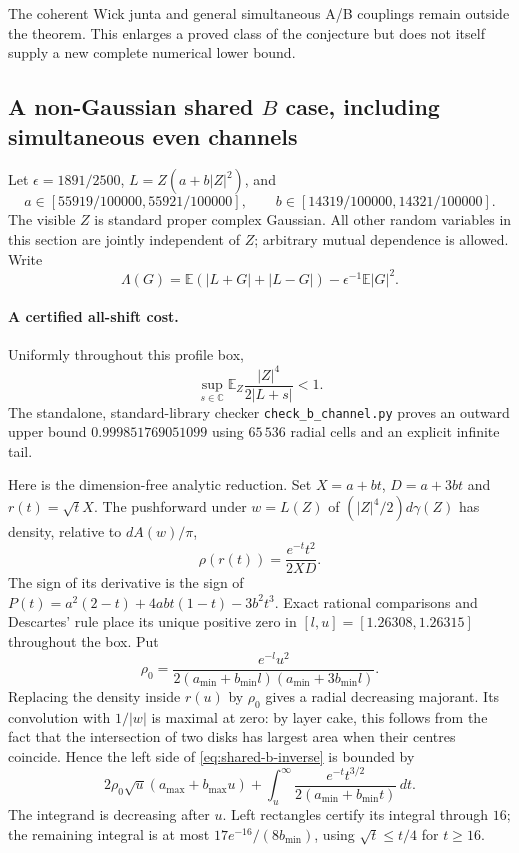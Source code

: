The coherent Wick junta and general simultaneous A/B couplings remain
outside the theorem. This enlarges a proved class of the conjecture but
does not itself supply a new complete numerical lower bound.

\subsection{A non-Gaussian shared $B$ case, including simultaneous even channels}
\label{sec:shared-b-symmetry}
Let $\epsilon=1891/2500$, $L=Z(a+b|Z|^2)$, and
\[
 a\in[55919/100000,55921/100000],\qquad
 b\in[14319/100000,14321/100000].
\]
The visible $Z$ is standard proper complex Gaussian. All other random
variables in this section are jointly independent of $Z$; arbitrary
mutual dependence is allowed. Write
\[
 \Lambda(G)=\mathbb E(|L+G|+|L-G|)-\epsilon^{-1}\mathbb E|G|^2.
\]

\paragraph{A certified all-shift cost.}
Uniformly throughout this profile box,
\begin{equation}\label{eq:shared-b-inverse}
 \sup_{s\in\mathbb C}\mathbb E_Z\frac{|Z|^4}{2|L+s|}<1.
\end{equation}
The standalone, standard-library checker \texttt{check\_b\_channel.py}
proves an outward upper bound $0.999851769051099$ using $65\,536$ radial
cells and an explicit infinite tail.

Here is the dimension-free analytic reduction. Set $X=a+bt$, $D=a+3bt$
and $r(t)=\sqrt tX$. The pushforward under $w=L(Z)$ of
$(|Z|^4/2)d\gamma(Z)$ has density, relative to $dA(w)/\pi$,
\[
 \rho(r(t))=\frac{e^{-t}t^2}{2XD}.
\]
The sign of its derivative is the sign of
$P(t)=a^2(2-t)+4abt(1-t)-3b^2t^3$.
Exact rational comparisons and Descartes' rule place its unique positive
zero in $[l,u]=[1.26308,1.26315]$ throughout the box. Put
\[
 \rho_0=\frac{e^{-l}u^2}
 {2(a_{\min}+b_{\min}l)(a_{\min}+3b_{\min}l)}.
\]
Replacing the density inside $r(u)$ by $\rho_0$ gives a radial decreasing
majorant. Its convolution with $1/|w|$ is maximal at zero: by layer cake,
this follows from the fact that the intersection of two disks has largest
area when their centres coincide. Hence the left side of
\eqref{eq:shared-b-inverse} is bounded by
\[
 2\rho_0\sqrt u(a_{\max}+b_{\max}u)
 +\int_u^\infty\frac{e^{-t}t^{3/2}}{2(a_{\min}+b_{\min}t)}\,dt.
\]
The integrand is decreasing after $u$. Left rectangles certify its
integral through $16$; the remaining integral is at most
$17e^{-16}/(8b_{\min})$, using $\sqrt t\le t/4$ for $t\ge16$.

